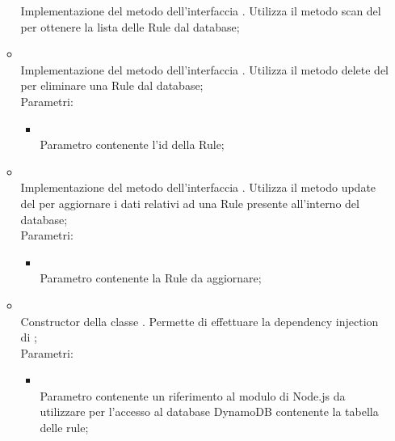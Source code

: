 \begin{itemize}
\begin{itemize}
		Implementazione del metodo dell'interfaccia . Utilizza il metodo scan del  per ottenere la lista delle Rule dal database;\\
		\item[]  \\
		Implementazione del metodo dell'interfaccia . Utilizza il metodo delete del  per eliminare una Rule dal database;\\
		Parametri:
		\begin{itemize}
			\item {} \\
			Parametro contenente l'id della Rule;
		\end{itemize}
		\item[]  \\
		Implementazione del metodo dell'interfaccia . Utilizza il metodo update del  per aggiornare i dati relativi ad una Rule presente all'interno del database;\\
		Parametri:
		\begin{itemize}
			\item {} \\
			Parametro contenente la Rule da aggiornare;
		\end{itemize}
		\item[]  \\
		Constructor della classe . Permette di effettuare la dependency injection di ;\\
		Parametri:
		\begin{itemize}
			\item {} \\
			Parametro contenente un riferimento al modulo di Node.js da utilizzare per l'accesso al database DynamoDB contenente la tabella delle rule;
		\end{itemize}
	\end{itemize}
\end{itemize}

